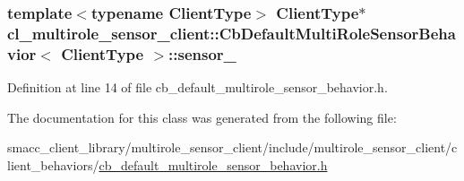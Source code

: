 \subsubsection[{\texorpdfstring{sensor\+\_\+}{sensor_}}]{\setlength{\rightskip}{0pt plus 5cm}template$<$typename Client\+Type$>$ Client\+Type$\ast$ {\bf cl\+\_\+multirole\+\_\+sensor\+\_\+client\+::\+Cb\+Default\+Multi\+Role\+Sensor\+Behavior}$<$ Client\+Type $>$\+::sensor\+\_\+}\hypertarget{classcl__multirole__sensor__client_1_1CbDefaultMultiRoleSensorBehavior_aada7313c036af6f60b1bd64e4a57b23f}{}\label{classcl__multirole__sensor__client_1_1CbDefaultMultiRoleSensorBehavior_aada7313c036af6f60b1bd64e4a57b23f}


Definition at line 14 of file cb\+\_\+default\+\_\+multirole\+\_\+sensor\+\_\+behavior.\+h.



The documentation for this class was generated from the following file\+:\begin{DoxyCompactItemize}
\item 
smacc\+\_\+client\+\_\+library/multirole\+\_\+sensor\+\_\+client/include/multirole\+\_\+sensor\+\_\+client/client\+\_\+behaviors/\hyperlink{cb__default__multirole__sensor__behavior_8h}{cb\+\_\+default\+\_\+multirole\+\_\+sensor\+\_\+behavior.\+h}\end{DoxyCompactItemize}
